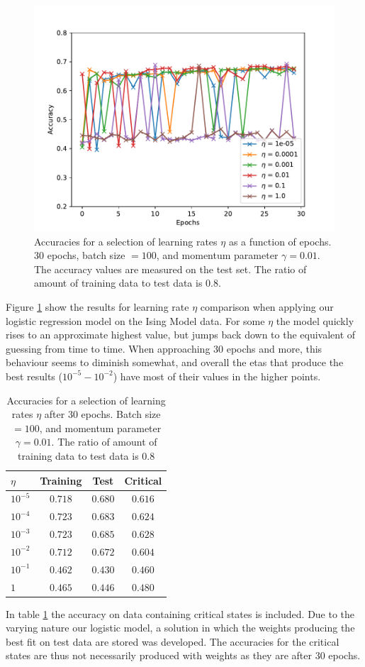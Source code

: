 \begin{figure}[H]
\includegraphics[width = 0.8\paperwidth]{figures/logistic_eta.pdf}
    \caption{Accuracies for a selection of learning rates $\eta$ as a function of epochs. 
    30 epochs, batch size $= 100$, and momentum parameter $\gamma = 0.01$. The accuracy
    values are measured on the test set.
    The ratio of amount of training data to test data is $0.8$.}
\label{fig:logistic-eta}
\end{figure}
Figure \ref{fig:logistic-eta} show the results for learning rate $\eta$ comparison when applying
our logistic regression model on the Ising Model data. For some $\eta$ the model quickly rises
to an approximate highest value, but jumps back down to the equivalent of guessing from time
to time. When approaching 30 epochs and more, this behaviour seems to diminish somewhat, and
overall the etas that produce the best results ($10^{-5} - 10^{-2}$) have most of their values
in the higher points.
\begin{table}[H]
\center
\begin{tabular}{l|c|c|c}
$\eta$ & Training & Test & Critical  \\
\hline
$10^{-5}$ & $0.718$ & $0.680$ & $0.616$ \\
$10^{-4}$ & $0.723$ & $0.683$ & $0.624$ \\
$10^{-3}$ & $0.723$ & $0.685$ & $0.628$ \\
$10^{-2}$ & $0.712$ & $0.672$ & $0.604$ \\
$10^{-1}$ & $0.462$ & $0.430$ & $0.460$ \\
$1$    & $0.465$ & $0.446$ & $0.480$
\end{tabular}
    \caption{Accuracies for a selection of learning rates $\eta$ after 
    30 epochs. Batch size $= 100$, and momentum parameter $\gamma = 0.01$.
    The ratio of amount of training data to test data is $0.8$}
    \label{tab:logistic-critical}
\end{table}
In table \ref{tab:logistic-critical} the accuracy on data containing critical states
is included. Due to the varying nature our logistic model, a solution in which the weights
producing the best fit on test data are stored was developed. The accuracies for the critical
states are thus not necessarily produced with weights as they are after 30 epochs.


